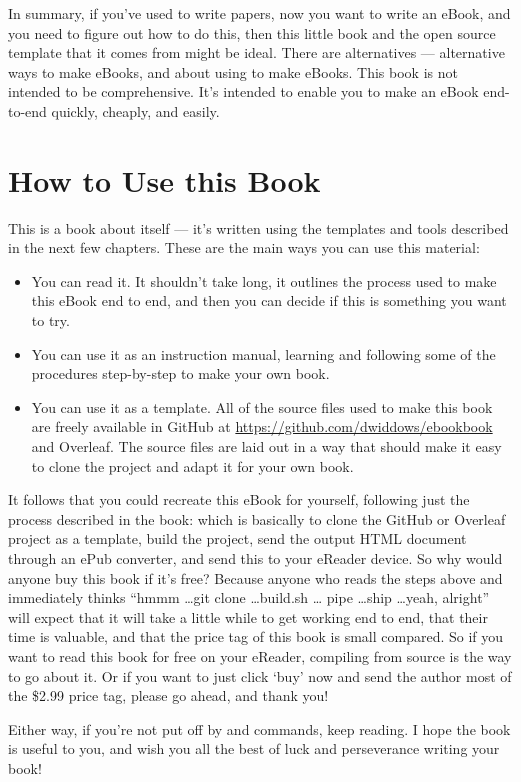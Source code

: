 In summary, if you've used \latex to write papers, now you want to write an eBook,
and you need to figure out how to do this, then this little book and
the open source template that it comes from might be ideal.
There are alternatives --- alternative ways to make eBooks, and about
using \latex to make eBooks. This book is not intended to be comprehensive. It's
intended to enable you to make an eBook end-to-end quickly, cheaply, and easily.

\section{How to Use this Book}

This is a book about itself --- it's written using the templates and tools described in 
the next few chapters. These are the main ways you can use this material:

\begin{itemize}
    \item You can read it. It shouldn't take long, it outlines the process
    used to make this eBook end to end, and then you can decide if this is something you want to try.
    \item You can use it as an instruction manual, learning and following some of the procedures step-by-step to make your own book.
    \item You can use it as a template. All of the source files used to make this book
    are freely available in GitHub at {\small \url{https://github.com/dwiddows/ebookbook}} and Overleaf.
    The source files are laid out in a way that should make it easy to clone the project and adapt it for your own book.
\end{itemize}

It follows that you could recreate this eBook for yourself, following just the process
described in the book: which is basically to clone the GitHub or Overleaf 
project as a template, build
the project, send the output HTML document through an ePub converter, and send this to
your eReader device. So why would anyone buy this book if it's free? Because
anyone who reads the steps above and immediately thinks ``hmmm \ldots git clone \ldots build.sh \ldots 
pipe \ldots ship \ldots yeah, alright'' will expect that it will take a little while to get working 
end to end, that their time is valuable, and that the price tag of this book is small
compared. So if you want to read this book for free on your eReader,
compiling from source is the way to go about it. Or if you want to just click `buy' now and send the author most of the
\$2.99 price tag, please go ahead, and thank you!

Either way, if you're not put off by \latex and 
commands, keep reading. I hope the book is useful to you, and wish you 
all the best of luck and perseverance writing your book!
